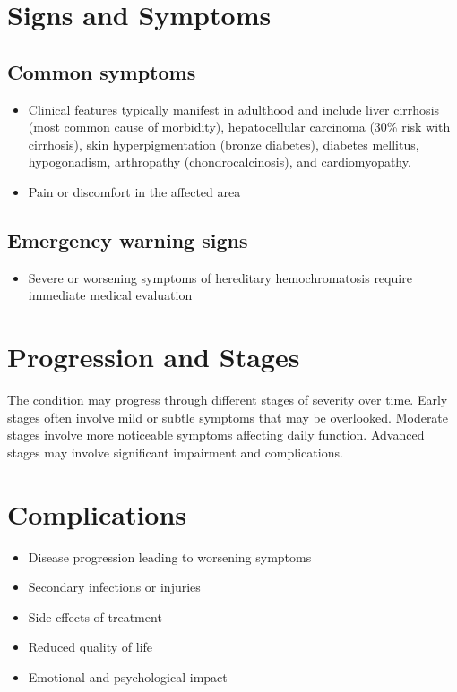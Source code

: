 \section{Signs and Symptoms}

\subsection{Common symptoms}
\begin{itemize}[noitemsep]
  \item Clinical features typically manifest in adulthood and include liver cirrhosis (most common cause of morbidity), hepatocellular carcinoma (30\% risk with cirrhosis), skin hyperpigmentation (bronze diabetes), diabetes mellitus, hypogonadism, arthropathy (chondrocalcinosis), and cardiomyopathy.

  \item Pain or discomfort in the affected area
  \end{itemize}

\subsection{Emergency warning signs}
\begin{itemize}[noitemsep]
  \item Severe or worsening symptoms of hereditary hemochromatosis require immediate medical evaluation
\end{itemize}
\section{Progression and Stages}
The condition may progress through different stages of severity over time. Early stages often involve mild or subtle symptoms that may be overlooked. Moderate stages involve more noticeable symptoms affecting daily function. Advanced stages may involve significant impairment and complications.
\section{Complications}
\begin{itemize}[noitemsep]
  \item Disease progression leading to worsening symptoms
  \item Secondary infections or injuries
  \item Side effects of treatment
  \item Reduced quality of life
  \item Emotional and psychological impact
\end{itemize}
